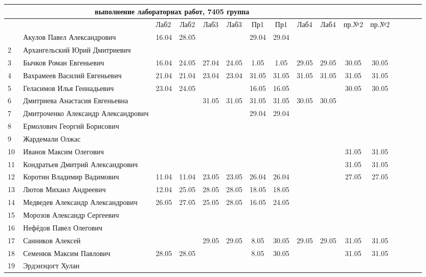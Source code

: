 \documentclass[a4paper,11pt]{article}
\begin{document}
\newpage
{}
\recalctypearea
%
\hspace{-6.4cm} %
\begin{tabular}{l|llccccccccccccc}
\multicolumn{10}{c}{выполнение лабораторнах работ, 7405 группа} \\
\toprule
	                                  &&Лаб2&Лаб2 & Лаб3&Лаб3& Пр1&Пр1& Лаб4&Лаб4&пр.№2&пр.№2\\
\midrule
\,&Акулов Павел Александрович             &16.04&28.05&     &     &29.04&29.04&&&\\
2\,&Архангельский Юрий Дмитриевич         &     &     &     &     &&&&\\
3\,&Бычков Роман Евгеньевич               &16.04&24.05&27.04&24.05& 1.05& 1.05&29.05 &29.05&30.05&30.05\\
4\,&Вахрамеев Василий Евгеньевич          &21.04&21.04&23.04&23.04&31.05&31.05&31.05 &31.05&31.05&31.05\\
5\,&Геласимов Илья Геннадьевич            &23.04&24.05&     &     &16.05&16.05&      &     &30.05&30.05\\
\midrule
6\,&Дмитриева Анастасия Евгеньевна        &     &     &31.05&31.05&31.05&31.05&30.05&30.05&\\
7\,&Дмитроченко Александр Александрович   &     &     &     &     &29.04&29.04&&&\\
8\,&Ермолович Георгий Борисович           &     &     &     &     &&&&\\
9\,&Жардемали Олжас                       &     &     &     &     &&&&\\
10\,&Иванов Максим Олегович               &     &     &     &     &     &     &     &      &31.05&31.05\\
\midrule
11\,&Кондратьев Дмитрий Александрович     &     &     &     &     &     &     &     &     &31.05&31.05\\
12\,&Коротин Владимир Вадимович           &11.04&11.04&23.05&23.05&26.04&26.04&     &     &27.05&27.05&\\
13\,&Лютов Михаил Андреевич               &12.04&25.05&28.05&28.05&18.05&18.05&&\\
14\,&Медведев Александр Александрович     &26.05&27.05&25.05&28.05&16.05&24.05&&\\
15\,&Морозов Александр Сергеевич          &&&&&&&&\\
\midrule
16\,&Нефёдов Павел Олегович               &&&&&&&&\\
17\,&Санников Алексей                     &     &     &29.05&29.05& 8.05&30.05&29.05&29.05&31.05&31.05\\
18\,&Семенюк Максим Павлович              &28.05&28.05&     &     & 8.05&30.05&     &     &31.05&31.05\\
19\,&Эрдэнэцогт Хулан                     &&&&&&&&\\
\bottomrule
\end{tabular}
\end{document}
